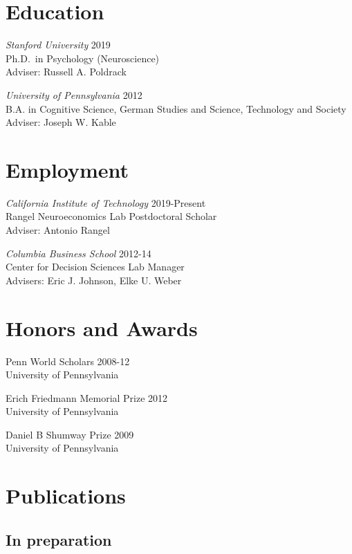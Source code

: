 \documentclass[11pt,]{article}
\begin{document}
\hypertarget{education}{%
\section{Education}\label{education}}

\emph{Stanford University} \hfill 2019\\
Ph.D.~in Psychology (Neuroscience)\\
Adviser: Russell A. Poldrack

\emph{University of Pennsylvania} \hfill 2012\\
B.A. in Cognitive Science, German Studies and Science, Technology and
Society\\
Adviser: Joseph W. Kable

\hypertarget{employment}{%
\section{Employment}\label{employment}}

\emph{California Institute of Technology} \hfill 2019-Present\\
Rangel Neuroeconomics Lab Postdoctoral Scholar\\
Adviser: Antonio Rangel

\emph{Columbia Business School} \hfill 2012-14\\
Center for Decision Sciences Lab Manager\\
Advisers: Eric J. Johnson, Elke U. Weber

\hypertarget{honors-and-awards}{%
\section{Honors and Awards}\label{honors-and-awards}}

Penn World Scholars \hfill 2008-12\\
University of Pennsylvania

Erich Friedmann Memorial Prize \hfill 2012\\
University of Pennsylvania

Daniel B Shumway Prize \hfill 2009\\
University of Pennsylvania

\hypertarget{publications}{%
\section{Publications}\label{publications}}

\hypertarget{in-preparation}{%
\subsection{In preparation}\label{in-preparation}}
\end{document}
